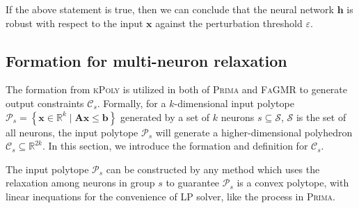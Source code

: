\documentclass[runningheads]{llncs}
\newcommand{\ourtool}{\textsc{FaGMR}\xspace}
\newcommand{\prima}{\textsc{Prima}\xspace}
\newcommand{\krelu}{\textsc{kPoly}\xspace}
\newcommand{\myvec}[1]{\boldsymbol{#1}}
\newcommand{\mymatrix}[1]{\boldsymbol{#1}}
\begin{document}
If the above statement is true, then we can conclude that the neural network
$\myvec{h}$ is robust with respect to the input $\myvec{x}$ against
the perturbation threshold $\varepsilon$.

%
%
%

\subsection{Formation for multi-neuron relaxation}\label{Subsec3.2}

The formation from \krelu is utilized in both of \prima and \ourtool to generate output constraints $\mathcal{C}_{s}$.
Formally, for a $k$-dimensional input polytope $\mathcal{P}_{s}=\left \{\myvec{x} \in \mathbb{R}^{k}\mid \mymatrix{A}\myvec{x}\leq \myvec{b}\right\}$ generated by a set of $k$ neurons $s\subseteq \mathcal{S}$, $\mathcal{S}$ is the set of all neurons,
 the input polytope $\mathcal{P}_{s}$ will generate a higher-dimensional polyhedron $\mathcal{C}_{s} \subseteq \mathbb{R}^{2k}$.
In this section, we introduce the formation and definition for $\mathcal{C}_{s}$.

The input polytope $\mathcal{P}_{s}$ can be constructed by any method which uses the relaxation among neurons in group $s$ to guarantee $\mathcal{P}_{s}$ is a convex polytope, with linear inequations for the  convenience of LP solver, like the process in \prima.  
\end{document}
